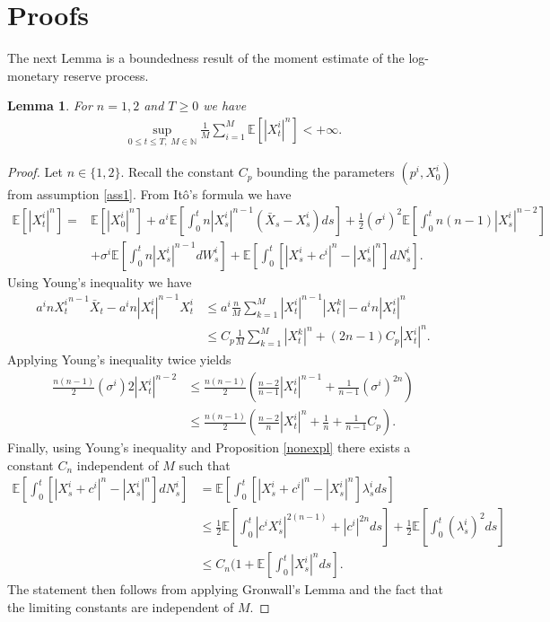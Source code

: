 \documentclass[10pt]{article}
\theoremstyle{plain}
\newtheorem{lemma}[theorem]{Lemma}                              %
\theoremstyle{definition}
\newcommand{\<}{\langle}
\renewcommand{\>}{\rangle}
\renewcommand{\(}{\left(}
\renewcommand{\)}{\right)}
\renewcommand{\[}{\left[}
\renewcommand{\]}{\right]}
\newcommand{\blu}[1]{\textcolor{blue}{#1}}
\begin{document}
\section{Proofs}\label{app2}
The next Lemma is a boundedness result of the moment estimate of the log-monetary reserve process.
\begin{lemma} \label{lemmabound} For $n=1,2$ %
and $T\geq 0$ we have
\begin{align}
\sup\limits_{0\leq t\leq
T,\;M\in\mathbb{N}}\frac{1}{M}\sum\limits_{i=1}^M\mathbb{E}\left[\left|X_t^i\right|^n\right]<+\infty.
\end{align}
\end{lemma}
\begin{proof}
Let $n\in\{1,2\}$. Recall the constant $C_p$ bounding the parameters $(p^i,X_0^i)$ from assumption \ref{ass1}. From It\^o's formula we have
\begin{align}
\mathbb{E}\left[|X_t^i|^n\right] =& \mathbb{E}\left[|X_0^i|^n\right] +
a^i\mathbb{E}\left[\int_0^tn|X_s^i|^{n-1}(\bar X_s-X^i_s)ds\right] +
\frac{1}{2}(\sigma^i)^2\mathbb{E}\left[\int_0^tn(n-1)|X_s^i|^{n-2}\right]\\
&+\sigma^i\mathbb{E}\left[\int_0^tn|X_s^i|^{n-1}dW_s^i\right] +
\mathbb{E}\left[\int_0^t\left[|X_s^i+c^i|^n-|X_s^i|^n\right]dN_s^i\right].
\end{align}
Using Young's inequality we have
\begin{align}
a^in{X_t^i}^{n-1}\bar X_t-a^in|X_t^i|^{n-1}X_t^i&\leq
a^i\frac{n}{M}\sum\limits_{k=1}^M|X_t^i|^{n-1}|X_t^k|-a^in|X_t^i|^{n}\\ &\leq
C_p\frac{1}{M}\sum\limits_{k=1}^M|X_t^k|^n+(2n-1)C_p|X_t^i|^n.
\end{align}
Applying Young's inequality twice yields
\begin{align}
\frac{n(n-1)}{2}(\sigma^i)2|X_t^i|^{n-2}&\leq \frac{n(n-1)}{2}\left(\frac{n-2}{n-1}|X_t^i|^{n-1}+\frac{1}{n-1}(\sigma^i)^{2n}\right)\\
&\leq \frac{n(n-1)}{2}\left(\frac{n-2}{n}|X_t^i|^{n}+\frac{1}{n}+\frac{1}{n-1}C_p\right).
\end{align}
Finally, using Young's inequality and Proposition \ref{nonexpl} there exists a constant $C_n$ independent of $M$ such that %
\begin{align}
\mathbb{E}\left[\int_0^t\left[|X_s^i+c^i|^n-|X_s^i|^n\right]dN_s^i\right]&=\mathbb{E}\left[\int_0^t\left[|X_s^i+c^i|^n-|X_s^i|^n\right]\lambda_s^ids\right]\\
&\leq \frac{1}{2}\mathbb{E}\left[\int_0^t|c^iX_s^i|^{2(n-1)}+|c^i|^{2n}ds\right]+\frac{1}{2}\mathbb{E}\left[\int_0^t(\lambda_s^i)^2ds\right]\\
&\leq C_n(1+\mathbb{E}\left[\int_0^t|X_s^i|^nds\right].
\end{align}
The statement then follows from applying Gronwall's Lemma and the fact that the limiting constants are independent of $M$.
\end{proof}
\end{document}
